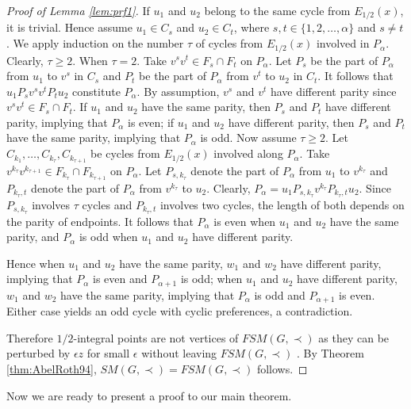 \documentclass[11pt]{article}
\numberwithin{theorem}{section}
\begin{document}
\begin{proof}[Proof of Lemma \ref{lem:prf1}]
If $u_1$ and $u_2$ belong to the same cycle from $E_{1/2}(x)$, it is trivial. Hence assume $u_1\in C_s$ and $u_2\in C_t$, where $s,t\in \{1,2,\ldots,\alpha\}$ and $s\not=t$. We apply induction on the number $\tau$ of cycles from $E_{1/2}(x)$ involved in $P_\alpha$. Clearly, $\tau\geq 2$.
When $\tau=2$. Take $v^s v^t\in F_s\cap F_t$ on $P_\alpha$.
Let $P_s$ be the part of $P_\alpha$ from $u_1$ to $v^s$ in $C_s$ and $P_t$ be the part of $P_\alpha$ from $v^t$ to $u_2$ in $C_t$.
It follows that $u_1 P_s v^s v^t P_t u_2$ constitute $P_\alpha$.
By assumption, $v^s$ and $v^t$ have different parity since $v^s v^t\in F_s\cap F_t$.
If $u_1$ and $u_2$ have the same parity, then $P_s$ and $P_t$ have different parity, implying that $P_\alpha$ is even; if $u_1$ and $u_2$ have different parity, then $P_s$ and $P_t$ have the same parity, implying that $P_\alpha$ is odd.
Now assume $\tau\geq 2$. Let $C_{k_1},\ldots,C_{k_\tau},C_{k_{\tau+1}}$ be cycles from $E_{1/2}(x)$ involved along $P_\alpha$.
Take $v^{k_{\tau}} v^{k_{\tau+1}} \in F_{k_{\tau}}\cap F_{k_{\tau+1}}$ on $P_\alpha$.
Let $P_{s, k_{\tau}}$ denote the part of $P_\alpha$ from $u_1$ to $v^{k_{\tau}}$ and $P_{k_{\tau},t}$ denote the part of $P_\alpha$ from $v^{k_{\tau}}$ to $u_2$.
Clearly, $P_\alpha=u_1 P_{s,k_\tau} v^{k_\tau} P_{k_\tau, t} u_2$. Since $P_{s, k_{\tau}}$ involves $\tau$ cycles and $P_{k_{\tau},t}$ involves two cycles, the length of both depends on the parity of endpoints. It follows that $P_\alpha$ is even when $u_1$ and $u_2$ have the same parity, and $P_\alpha$ is odd when $u_1$ and $u_2$ have different parity.

Hence when $u_1$ and $u_2$ have the same parity, $w_1$ and $w_2$ have different parity, implying that $P_\alpha$ is even and $P_{\alpha+1}$ is odd;
when $u_1$ and $u_2$ have different parity, $w_1$ and $w_2$ have the same parity, implying that $P_\alpha$ is odd and $P_{\alpha+1}$ is even. 
Either case yields an odd cycle with cyclic preferences, a contradiction.

Therefore $1/2$-integral points are not vertices of $FSM(G,\prec)$ as they can be perturbed by $\epsilon z$ for small $\epsilon$ without leaving $FSM(G,\prec)$ . By Theorem \ref{thm:AbelRoth94}, $SM(G,\prec)=FSM(G,\prec)$ follows. 
\end{proof}

Now we are ready to present a proof to our main theorem.
\end{document}
